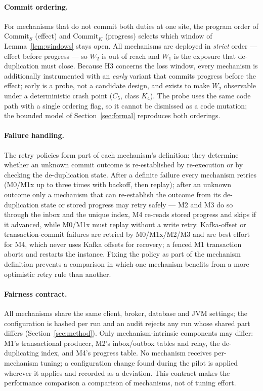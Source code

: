 \paragraph{Commit ordering.}
For mechanisms that do not commit both duties at one site, the program order of
$\mathrm{Commit}_{S}$ (effect) and $\mathrm{Commit}_{K}$ (progress) selects which window of
Lemma~\ref{lem:windows} stays open. All mechanisms are deployed in \emph{strict} order ---
effect before progress --- so $W_2$ is out of reach and $W_1$ is the exposure that
de-duplication must close. Because H3 concerns the loss window, every mechanism is additionally
instrumented with an \emph{early} variant that commits progress before the effect; early is a
probe, not a candidate design, and exists to make $W_2$ observable under a deterministic crash
point ($C_5$, class $K_4$). The probe uses the same code path with a single ordering flag, so it
cannot be dismissed as a code mutation; the bounded model of Section~\ref{sec:formal} reproduces
both orderings.

\paragraph{Failure handling.}
The retry policies form part of each mechanism's definition: they determine whether an unknown
commit outcome is re-established by re-execution or by checking the de-duplication state. After a
definite failure every mechanism retries (M0/M1x up to three times with backoff, then replay);
after an unknown outcome only a mechanism that can re-establish the outcome from its
de-duplication state or stored progress may retry safely --- M2 and M3 do so through the inbox
and the unique index, M4 re-reads stored progress and skips if it advanced, while M0/M1x must
replay without a write retry. Kafka-offset or transaction-commit failures are retried by
M0/M1x/M2/M3 and are best effort for M4, which never uses Kafka offsets for recovery; a fenced
M1 transaction aborts and restarts the instance. Fixing the policy as part of the mechanism
definition prevents a comparison in which one mechanism benefits from a more optimistic retry
rule than another.

\paragraph{Fairness contract.}
All mechanisms share the same client, broker, database and JVM settings; the configuration is
hashed per run and an audit rejects any run whose shared part differs (Section~\ref{sec:method}).
Only mechanism-intrinsic components may differ: M1's transactional producer, M2's inbox/outbox
tables and relay, the de-duplicating index, and M4's progress table. No mechanism receives
per-mechanism tuning; a configuration change found during the pilot is applied wherever it
applies and recorded as a deviation. This contract makes the performance comparison a comparison
of mechanisms, not of tuning effort.
